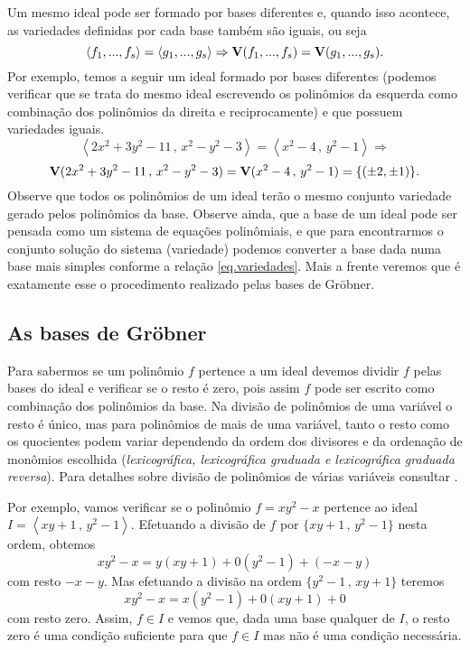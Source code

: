 Um mesmo ideal pode ser formado por bases diferentes e, quando isso acontece, as variedades definidas por cada base também são iguais, ou seja
\begin{equation*}
\left\langle f_1,...,f_s \right\rangle = \left\langle g_1,...,g_s \right\rangle \Rightarrow {\bf V}(f_1,...,f_s)={\bf V}(g_1,...,g_s).
\end{equation*}
Por exemplo, temos a seguir um ideal formado por bases diferentes (podemos verificar que se trata do mesmo ideal escrevendo os polinômios da esquerda como combinação dos polinômios da direita e reciprocamente) e que possuem variedades iguais.
\begin{equation*}
\left\langle 2x^2+3y^2-11\,,\,x^2-y^2-3 \right\rangle = \left\langle x^2-4\,,\,y^2-1 \right\rangle \Rightarrow
\end{equation*}
\begin{equation}\label{eq.variedades}
{\bf V}(2x^2+3y^2-11\,,\,x^2-y^2-3)={\bf V}(x^2-4\,,\,y^2-1)=\{(\pm2,\pm1)\}.
\end{equation}
Observe que todos os polinômios de um ideal terão o mesmo conjunto variedade gerado pelos polinômios da base. Observe ainda, que a base de um ideal pode ser pensada como um sistema de equações polinômiais, e que para encontrarmos o conjunto solução do sistema (variedade) podemos converter a base dada numa base mais simples conforme a relação \ref{eq.variedades}. Mais a frente veremos que é exatamente esse o procedimento realizado pelas bases de Gr\"obner.

\subsection*{As bases de Gr\"obner}

Para sabermos se um polinômio $f$ pertence a um ideal devemos dividir $f$ pelas bases do ideal e verificar se o resto é zero, pois assim $f$ pode ser escrito como combinação dos polinômios da base. Na divisão de polinômios de uma variável o resto é único, mas para polinômios de mais de uma variável, tanto o resto como os quocientes podem variar dependendo da ordem dos divisores e da ordenação de monômios escolhida ({\it lexicográfica, lexicográfica graduada e lexicográfica graduada reversa}). Para detalhes sobre divisão de polinômios de várias variáveis consultar \citep{cox-ideals}. 

Por exemplo, vamos verificar se o polinômio $f=xy^2-x$ pertence ao ideal $I=\left\langle xy+1\,,\,y^2-1 \right\rangle$. Efetuando a divisão de $f$ por $\{xy+1\,,\,y^2-1\}$ nesta ordem, obtemos
\begin{equation*}
xy^2-x=y(xy+1)+0(y^2-1)+(-x-y)
\end{equation*}  
com resto $-x-y$. Mas efetuando a divisão na ordem $\{y^2-1\,,\,xy+1\}$ teremos
\begin{equation*}
xy^2-x=x(y^2-1)+0(xy+1)+0
\end{equation*} 
com resto zero. Assim, $f\in I$ e vemos que, dada uma base qualquer de $I$, o resto zero é uma condição suficiente para que $f\in I$ mas não é uma condição necessária. 


